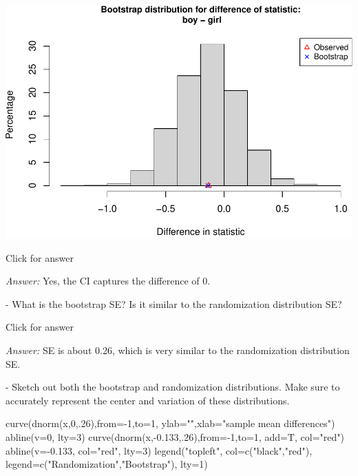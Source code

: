 \documentclass[
]{book}
\newenvironment{Shaded}{\begin{snugshade}}{\end{snugshade}}
\newcommand{\AttributeTok}[1]{\textcolor[rgb]{0.77,0.63,0.00}{#1}}
\newcommand{\DecValTok}[1]{\textcolor[rgb]{0.00,0.00,0.81}{#1}}
\newcommand{\FloatTok}[1]{\textcolor[rgb]{0.00,0.00,0.81}{#1}}
\newcommand{\FunctionTok}[1]{\textcolor[rgb]{0.00,0.00,0.00}{#1}}
\newcommand{\NormalTok}[1]{#1}
\newcommand{\SpecialCharTok}[1]{\textcolor[rgb]{0.00,0.00,0.00}{#1}}
\newcommand{\StringTok}[1]{\textcolor[rgb]{0.31,0.60,0.02}{#1}}
\begin{document}
\includegraphics[width=1\linewidth]{Class_Activity_14_files/figure-latex/unnamed-chunk-5-1}

Click for answer

\emph{Answer:} Yes, the CI captures the difference of 0.

- What is the bootstrap SE? Is it similar to the randomization distribution SE?
\vspace*{.5in}

Click for answer

\emph{Answer:} SE is about 0.26, which is very similar to the randomization distribution SE.

- Sketch out both the bootstrap and randomization distributions. Make sure to accurately represent the center and variation of these distributions.

\begin{Shaded}
\begin{Highlighting}[]
\FunctionTok{curve}\NormalTok{(}\FunctionTok{dnorm}\NormalTok{(x,}\DecValTok{0}\NormalTok{,.}\DecValTok{26}\NormalTok{),}\AttributeTok{from=}\SpecialCharTok{{-}}\DecValTok{1}\NormalTok{,}\AttributeTok{to=}\DecValTok{1}\NormalTok{, }\AttributeTok{ylab=}\StringTok{""}\NormalTok{,}\AttributeTok{xlab=}\StringTok{"sample mean differences"}\NormalTok{)}
\FunctionTok{abline}\NormalTok{(}\AttributeTok{v=}\DecValTok{0}\NormalTok{, }\AttributeTok{lty=}\DecValTok{3}\NormalTok{)}
\FunctionTok{curve}\NormalTok{(}\FunctionTok{dnorm}\NormalTok{(x,}\SpecialCharTok{{-}}\FloatTok{0.133}\NormalTok{,.}\DecValTok{26}\NormalTok{),}\AttributeTok{from=}\SpecialCharTok{{-}}\DecValTok{1}\NormalTok{,}\AttributeTok{to=}\DecValTok{1}\NormalTok{, }\AttributeTok{add=}\NormalTok{T, }\AttributeTok{col=}\StringTok{"red"}\NormalTok{)}
\FunctionTok{abline}\NormalTok{(}\AttributeTok{v=}\SpecialCharTok{{-}}\FloatTok{0.133}\NormalTok{, }\AttributeTok{col=}\StringTok{"red"}\NormalTok{, }\AttributeTok{lty=}\DecValTok{3}\NormalTok{)}
\FunctionTok{legend}\NormalTok{(}\StringTok{"topleft"}\NormalTok{, }\AttributeTok{col=}\FunctionTok{c}\NormalTok{(}\StringTok{"black"}\NormalTok{,}\StringTok{"red"}\NormalTok{), }\AttributeTok{legend=}\FunctionTok{c}\NormalTok{(}\StringTok{"Randomization"}\NormalTok{,}\StringTok{"Bootstrap"}\NormalTok{), }\AttributeTok{lty=}\DecValTok{1}\NormalTok{)}
\end{Highlighting}
\end{Shaded}
\end{document}
